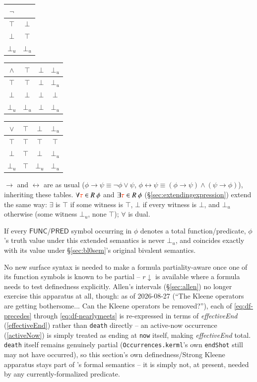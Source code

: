 \begin{center}
\begin{tabular}{c|c}
$\lnot$ & \\\hline
$\top$ & $\bot$\\
$\bot$ & $\top$\\
$\bot_u$ & $\bot_u$
\end{tabular}
\qquad
\begin{tabular}{c|ccc}
$\wedge$ & $\top$ & $\bot$ & $\bot_u$ \\\hline
$\top$ & $\top$ & $\bot$ & $\bot_u$ \\
$\bot$ & $\bot$ & $\bot$ & $\bot$ \\
$\bot_u$ & $\bot_u$ & $\bot$ & $\bot_u$
\end{tabular}
\qquad
\begin{tabular}{c|ccc}
$\vee$ & $\top$ & $\bot$ & $\bot_u$ \\\hline
$\top$ & $\top$ & $\top$ & $\top$ \\
$\bot$ & $\top$ & $\bot$ & $\bot_u$ \\
$\bot_u$ & $\top$ & $\bot_u$ & $\bot_u$
\end{tabular}
\end{center}

\pn $\rightarrow$ and $\leftrightarrow$ are as usual ($\phi\rightarrow\psi \equiv \lnot\phi\vee\psi$, $\phi\leftrightarrow\psi\equiv(\phi\rightarrow\psi)\wedge(\psi\rightarrow\phi)$), inheriting these tables. $\forall\msc{\tau}\in R~\phi$ and $\exists\msc{\tau}\in R~\phi$ (\S\ref{sec:extendingexpression}) extend the same way: $\exists$ is $\top$ if some witness is $\top$, $\bot$ if every witness is $\bot$, and $\bot_u$ otherwise (some witness $\bot_u$, none $\top$); $\forall$ is dual.

\begin{theorem}\label{thm:conservativity} If every $\mathsf{FUNC}$/$\mathsf{PRED}$ symbol occurring in $\phi$ denotes a total function/predicate, $\phi$'s truth value under this extended semantics is never $\bot_u$, and coincides exactly with its value under \S\ref{sec:bl0sem}'s original bivalent semantics.
\end{theorem}

\pn No new surface syntax is needed to make a formula partiality-aware once one of its function symbols is
known to be partial -- $r\!\downarrow$ is available where a formula needs to test definedness explicitly.
Allen's intervals (\S\ref{sec:allen}) no longer exercise this apparatus at all, though: as of 2026-08-27
(``The Kleene operators are getting bothersome... Can the Kleene operators be removed?''), each of
\eqref{eq:df-precedes} through \eqref{eq:df-nearlymeets} is re-expressed in terms of \textit{effectiveEnd}
(\ref{effectiveEnd}) rather than \texttt{death} directly -- an active-now occurrence (\ref{activeNow}) is
simply treated as ending at \texttt{now} itself, making \textit{effectiveEnd} total. \texttt{death} itself
remains genuinely partial (\texttt{Occurrences.kerml}'s own \texttt{endShot} still may not have occurred),
so this section's own definedness/Strong Kleene apparatus stays part of \logicid's formal semantics -- it is
simply not, at present, needed by any currently-formalized predicate.


